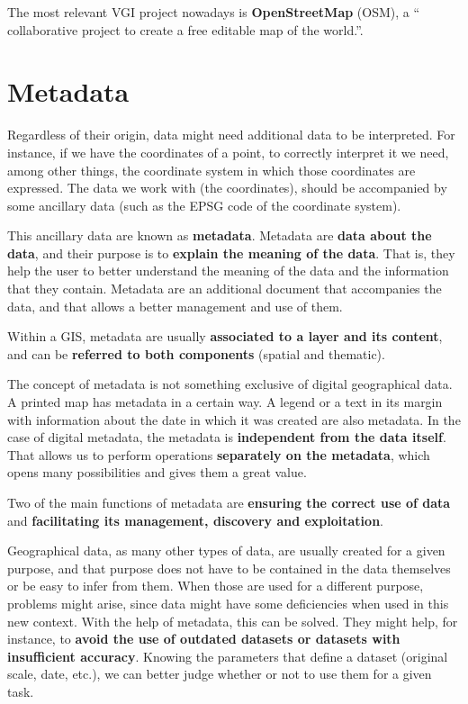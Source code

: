 The most relevant VGI project nowadays is \textbf{OpenStreetMap} (OSM), a `` collaborative project to create a free editable map of the world.''.


\section{Metadata}

Regardless of their origin, data might need additional data to be interpreted. For instance, if we have the coordinates of a point, to correctly interpret it we need, among other things, the coordinate system in which those coordinates are expressed. The data we work with (the coordinates), should be accompanied by some ancillary data (such as the EPSG code of the coordinate system).

This ancillary data are known as \textbf{metadata}. Metadata are \textbf{data about the data}, and their purpose is to \textbf{explain the meaning of the data}. That is, they help the user to better understand the meaning of the data and the information that they contain. Metadata are an additional document that accompanies the data, and that allows a better management and use of them.

Within a GIS, metadata are usually \textbf{associated to a layer and its content}, and can be \textbf{referred to both components} (spatial and thematic).

The concept of metadata is not something exclusive of digital geographical data. A printed map has metadata in a certain way. A legend or a text in its margin with information about the date in which it was created are also metadata. In the case of digital metadata, the metadata is \textbf{independent from the data itself}. That allows us to perform operations \textbf{separately on the metadata}, which opens many possibilities and gives them a great value.

Two of the main functions of metadata are \textbf{ensuring the correct use of data} and \textbf{facilitating its management, discovery and exploitation}.

Geographical data, as many other types of data, are usually created for a given purpose, and that purpose does not have to be contained in the data themselves or be easy to infer from them. When those are used for a different purpose, problems might arise, since data might have some deficiencies when used in this new context. With the help of metadata, this can be solved. They might help, for instance, to \textbf{avoid the use of outdated datasets or datasets with insufficient accuracy}. Knowing the parameters that define a dataset (original scale, date, etc.), we can better judge whether or not to use them for a given task.

